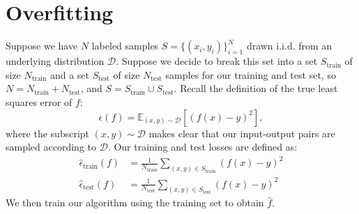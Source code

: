 \documentclass{article}
\begin{document}
\section*{Overfitting}
\begin{bprob}
    Suppose we have $N$ labeled samples $S = \{(x_i,y_i)\}_{i=1}^N$ drawn i.i.d. from an underlying distribution $\mathcal{D}$. Suppose we decide to break this set into a set $S_{\textrm{train}}$ of size $N_{\textrm{train}}$ and a set $S_{\textrm{test}}$ of size $N_{\textrm{test}}$ samples for our training and test set, so $N = N_{\textrm{train}} + N_{\textrm{test}}$, and $S = S_{\textrm{train}} \cup S_{\textrm{test}}$.  Recall the definition of the true least squares error of $f$:
    \[
      \epsilon(f) = 
      \mathbb{E}_{(x,y) \sim \mathcal{D}} [ (f(x) -y)^2 ],
    \]
    where the subscript $(x,y) \sim \mathcal{D}$ makes clear that our input-output pairs are sampled according to $\mathcal{D}$. Our training and test losses are defined as:
    \begin{align*}
        \widehat{\epsilon}_{\textrm{train}}(f) &=
        \frac{1}{N _{\textrm{train}}} \sum_{(x,y)\in S_{\textrm{train}}}     (f(x) -y)^2\\
        \widehat{\epsilon}_{\textrm{test}}(f) &=
        \frac{1}{N _{\textrm{test}}} \sum_{(x,y)\in S_{\textrm{test}}}     (f(x) -y)^2  
    \end{align*}
    We then train our algorithm using the training set to obtain $\widehat{f}$.
    

\end{bprob}
\end{document}
